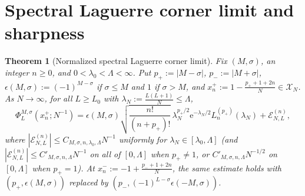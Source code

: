 \documentclass[11pt]{article}
\newtheorem{theorem}{Theorem}[section]
\theoremstyle{definition}
\theoremstyle{remark}
\newcommand{\cE}{\mathcal{E}}
\newcommand{\cX}{\mathcal{X}}
\renewcommand{\_}{\oldunderscore\penalty0\hskip0pt\relax}
\begin{document}
\section{Spectral Laguerre corner limit and sharpness}
\label{sec:laguerre-corner}

\begin{theorem}[Normalized spectral Laguerre corner limit]
\label{thm:laguerre-corner}
Fix $(M,\sigma)$, an integer $n\ge 0$, and $0<\lambda_0<\Lambda<\infty$. Put $p_+:=|M-\sigma|$, $p_-:=|M+\sigma|$,
  $\epsilon(M,\sigma):=(-1)^{M-\sigma}$ if $\sigma\le M$ and $1$ if $\sigma>M$, and $x_n^+:=1-\frac{p_++1+2n}{N}\in\cX_N$. As
  $N\to\infty$, for all $L\ge L_0$ with $\lambda_N:=\frac{L(L+1)}{N}\le\Lambda$,
\begin{equation}
  \Phi_L^{M,\sigma}(x_n^+;N^{-1}) = \epsilon(M,\sigma)\sqrt{\frac{n!}{(n+p_+)!}}\,\lambda_N^{p_+/2}\mathrm{e}^{-\lambda_N/2}L_n^{(p_+)}(\lambda_N) + \cE_{N,L}^{(n)},
  \label{eq:laguerre-limit-plus}
\end{equation}
where $|\cE_{N,L}^{(n)}|\le C_{M,\sigma,n,\lambda_0,\Lambda}N^{-1}$ uniformly for $\lambda_N\in[\lambda_0,\Lambda]$ (and
  $|\cE_{N,L}^{(n)}|\le C'_{M,\sigma,n,\Lambda}N^{-1}$ on all of $[0,\Lambda]$ when $p_+\ne1$, or
  $C'_{M,\sigma,n,\Lambda}N^{-1/2}$ on $[0,\Lambda]$ when $p_+=1$). At $x_n^-:=-1+\frac{p_-+1+2n}{N}$, the same estimate
  holds with $(p_+,\epsilon(M,\sigma))$ replaced by $(p_-,(-1)^{L-\sigma}\epsilon(-M,\sigma))$.
\end{theorem}
\end{document}
